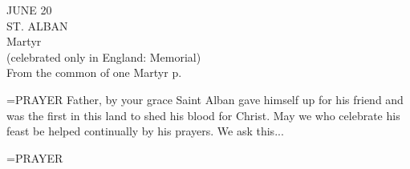 \begin{center}\normalsize JUNE 20\\
\footnotesize ST. ALBAN\\
\footnotesize Martyr\\
\footnotesize (celebrated only in England: Memorial)\\
\footnotesize From the common of one Martyr p. \\
\end{center}

\hangindent=\parindent \small{PRAYER 
Father, by your grace Saint Alban gave himself up for his friend
and was the first in this land to shed his blood for Christ. May we
who celebrate his feast be helped continually by his prayers. We ask
this...\\}
 
\hangindent=\parindent \small{PRAYER \\}
 
